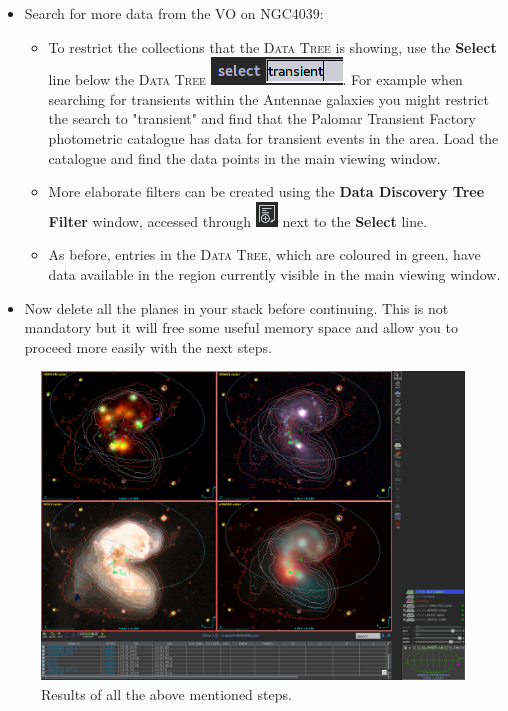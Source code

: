 \documentclass [a4paper, 12pt]{article}
\begin{document}
\begin{itemize}
    \item Search for more data from the VO on NGC4039:
    \begin{itemize}
        \item To restrict the collections that the \textsc{Data Tree} is 
        showing, use the \textbf{Select} line below the 
        \textsc{Data Tree} \includegraphics[width=0.1  
        \textwidth]{../images/aladin_select_transient.png}. For example when 
        searching for transients within 
        the Antennae galaxies you might restrict the search to "transient" and 
        find that the Palomar Transient Factory photometric catalogue has data 
        for transient events in the area. Load the catalogue and find the data 
        points in the main viewing window. 
        \item More elaborate filters can be created using the \textbf{Data 
        Discovery Tree Filter} window, accessed through 
        \includegraphics[width=0.04  
        \textwidth]{../images/aladin_button_filtertree.png} next to the 
        \textbf{Select} line.
        \item As before, entries in the \textsc{Data Tree}, which are coloured 
        in green, have data available in the region currently visible in the 
        main viewing window.  
    \end{itemize}
    \item Now delete all the planes in your stack before continuing. This is 
    not mandatory but it will free some useful memory space and allow you to 
    proceed more easily with the next steps.
\end{itemize}    
\begin{figure}[H]
\center
\includegraphics[width=0.7  
\textwidth]{../images/aladin_results_cdstutorial-sec4.png}
\caption{Results of all the above mentioned steps.}
\label{fig:aladinNGC4039}
\end{figure}
\end{document}
